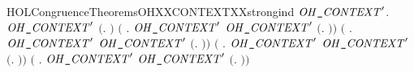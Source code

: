 \newcommand{\HOLCongruenceTheoremsOHXXCONTEXTXXrules}{\UseVerbatim{HOLCongruenceTheoremsOHXXCONTEXTXXrules}}
\begin{SaveVerbatim}{HOLCongruenceTheoremsOHXXCONTEXTXXstrongind}
\HOLTokenTurnstile{} \HOLSymConst{\HOLTokenForall{}}\ensuremath{\HOLBoundVar{OH\HOLTokenUnderscore{}CONTEXT}\sp{\prime}}.
       \ensuremath{\HOLBoundVar{OH\HOLTokenUnderscore{}CONTEXT}\sp{\prime}} \ensuremath{(}\HOLTokenLambda{}. \ensuremath{)} \HOLSymConst{\HOLTokenConj{}}
       \ensuremath{(}\HOLSymConst{\HOLTokenForall{}} .
              \HOLSymConst{\HOLTokenConj{}} \ensuremath{\HOLBoundVar{OH\HOLTokenUnderscore{}CONTEXT}\sp{\prime}}  \HOLSymConst{\HOLTokenImp{}}
            \ensuremath{\HOLBoundVar{OH\HOLTokenUnderscore{}CONTEXT}\sp{\prime}} \ensuremath{(}\HOLTokenLambda{}. \HOLSymConst{\ensuremath{\ldotp}} \ensuremath{)}\ensuremath{)} \HOLSymConst{\HOLTokenConj{}}
       \ensuremath{(}\HOLSymConst{\HOLTokenForall{}} .
              \HOLSymConst{\HOLTokenConj{}} \ensuremath{\HOLBoundVar{OH\HOLTokenUnderscore{}CONTEXT}\sp{\prime}}  \HOLSymConst{\HOLTokenImp{}}
            \ensuremath{\HOLBoundVar{OH\HOLTokenUnderscore{}CONTEXT}\sp{\prime}} \ensuremath{(}\HOLTokenLambda{}.   \HOLSymConst{\ensuremath{+}} \ensuremath{)}\ensuremath{)} \HOLSymConst{\HOLTokenConj{}}
       \ensuremath{(}\HOLSymConst{\HOLTokenForall{}} .
              \HOLSymConst{\HOLTokenConj{}} \ensuremath{\HOLBoundVar{OH\HOLTokenUnderscore{}CONTEXT}\sp{\prime}}  \HOLSymConst{\HOLTokenImp{}}
            \ensuremath{\HOLBoundVar{OH\HOLTokenUnderscore{}CONTEXT}\sp{\prime}} \ensuremath{(}\HOLTokenLambda{}.  \HOLSymConst{\ensuremath{+}}  \ensuremath{)}\ensuremath{)} \HOLSymConst{\HOLTokenConj{}}
       \ensuremath{(}\HOLSymConst{\HOLTokenForall{}} .
              \HOLSymConst{\HOLTokenConj{}} \ensuremath{\HOLBoundVar{OH\HOLTokenUnderscore{}CONTEXT}\sp{\prime}}  \HOLSymConst{\HOLTokenImp{}}
            \ensuremath{\HOLBoundVar{OH\HOLTokenUnderscore{}CONTEXT}\sp{\prime}} \ensuremath{(}\HOLTokenLambda{}.   \HOLSymConst{\ensuremath{\mid}} \ensuremath{)}\ensuremath{)} \HOLSymConst{\HOLTokenConj{}}

\end{SaveVerbatim}
